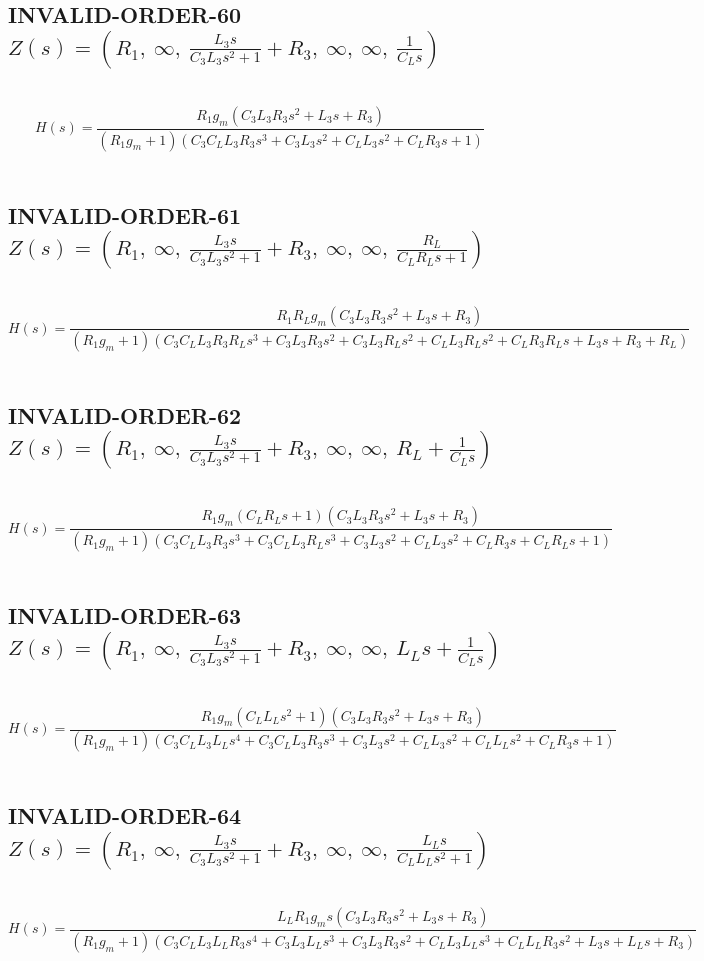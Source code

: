 \documentclass{article}
\begin{document}
\subsection{INVALID-ORDER-60 $Z(s) = \left( R_{1}, \  \infty, \  \frac{L_{3} s}{C_{3} L_{3} s^{2} + 1} + R_{3}, \  \infty, \  \infty, \  \frac{1}{C_{L} s}\right)$ } \ 
\textbf{\[H(s) = \frac{R_{1} g_{m} \left(C_{3} L_{3} R_{3} s^{2} + L_{3} s + R_{3}\right)}{\left(R_{1} g_{m} + 1\right) \left(C_{3} C_{L} L_{3} R_{3} s^{3} + C_{3} L_{3} s^{2} + C_{L} L_{3} s^{2} + C_{L} R_{3} s + 1\right)}\] } \ 
\subsection{INVALID-ORDER-61 $Z(s) = \left( R_{1}, \  \infty, \  \frac{L_{3} s}{C_{3} L_{3} s^{2} + 1} + R_{3}, \  \infty, \  \infty, \  \frac{R_{L}}{C_{L} R_{L} s + 1}\right)$ } \ 
\textbf{\[H(s) = \frac{R_{1} R_{L} g_{m} \left(C_{3} L_{3} R_{3} s^{2} + L_{3} s + R_{3}\right)}{\left(R_{1} g_{m} + 1\right) \left(C_{3} C_{L} L_{3} R_{3} R_{L} s^{3} + C_{3} L_{3} R_{3} s^{2} + C_{3} L_{3} R_{L} s^{2} + C_{L} L_{3} R_{L} s^{2} + C_{L} R_{3} R_{L} s + L_{3} s + R_{3} + R_{L}\right)}\] } \ 
\subsection{INVALID-ORDER-62 $Z(s) = \left( R_{1}, \  \infty, \  \frac{L_{3} s}{C_{3} L_{3} s^{2} + 1} + R_{3}, \  \infty, \  \infty, \  R_{L} + \frac{1}{C_{L} s}\right)$ } \ 
\textbf{\[H(s) = \frac{R_{1} g_{m} \left(C_{L} R_{L} s + 1\right) \left(C_{3} L_{3} R_{3} s^{2} + L_{3} s + R_{3}\right)}{\left(R_{1} g_{m} + 1\right) \left(C_{3} C_{L} L_{3} R_{3} s^{3} + C_{3} C_{L} L_{3} R_{L} s^{3} + C_{3} L_{3} s^{2} + C_{L} L_{3} s^{2} + C_{L} R_{3} s + C_{L} R_{L} s + 1\right)}\] } \ 
\subsection{INVALID-ORDER-63 $Z(s) = \left( R_{1}, \  \infty, \  \frac{L_{3} s}{C_{3} L_{3} s^{2} + 1} + R_{3}, \  \infty, \  \infty, \  L_{L} s + \frac{1}{C_{L} s}\right)$ } \ 
\textbf{\[H(s) = \frac{R_{1} g_{m} \left(C_{L} L_{L} s^{2} + 1\right) \left(C_{3} L_{3} R_{3} s^{2} + L_{3} s + R_{3}\right)}{\left(R_{1} g_{m} + 1\right) \left(C_{3} C_{L} L_{3} L_{L} s^{4} + C_{3} C_{L} L_{3} R_{3} s^{3} + C_{3} L_{3} s^{2} + C_{L} L_{3} s^{2} + C_{L} L_{L} s^{2} + C_{L} R_{3} s + 1\right)}\] } \ 
\subsection{INVALID-ORDER-64 $Z(s) = \left( R_{1}, \  \infty, \  \frac{L_{3} s}{C_{3} L_{3} s^{2} + 1} + R_{3}, \  \infty, \  \infty, \  \frac{L_{L} s}{C_{L} L_{L} s^{2} + 1}\right)$ } \ 
\textbf{\[H(s) = \frac{L_{L} R_{1} g_{m} s \left(C_{3} L_{3} R_{3} s^{2} + L_{3} s + R_{3}\right)}{\left(R_{1} g_{m} + 1\right) \left(C_{3} C_{L} L_{3} L_{L} R_{3} s^{4} + C_{3} L_{3} L_{L} s^{3} + C_{3} L_{3} R_{3} s^{2} + C_{L} L_{3} L_{L} s^{3} + C_{L} L_{L} R_{3} s^{2} + L_{3} s + L_{L} s + R_{3}\right)}\] } \ 
\end{document}
